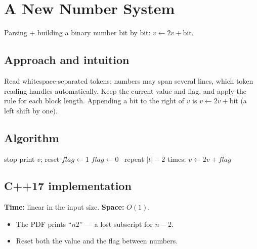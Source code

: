 \section{A New Number System}
\label{sec:b-new-number}


\begin{patternbox}
Parsing + building a binary number bit by bit: $v\gets2v+\text{bit}$.
\end{patternbox}

\subsection*{Approach and intuition}

Read whitespace-separated tokens; numbers may span several lines, which token
reading handles automatically. Keep the current value and flag, and apply the
rule for each block length. Appending a bit to the right of $v$ is
$v\gets 2v+\text{bit}$ (a left shift by one).

\subsection*{Algorithm}
\begin{algorithmic}[1]
   stop
   print $v$; reset
   $flag\gets1$
   $flag\gets0$
  \Else\ repeat $|t|-2$ times: $v\gets2v+flag$
  \EndIf
\EndFor
\end{algorithmic}


\subsection*{C++17 implementation}

\begin{complexitybox}
\textbf{Time:} linear in the input size. \textbf{Space:} $O(1)$.
\end{complexitybox}

\begin{pitfallbox}
\begin{itemize}
  \item The PDF prints ``$n2$'' --- a lost subscript for $n-2$.
  \item Reset both the value and the flag between numbers.
\end{itemize}
\end{pitfallbox}

